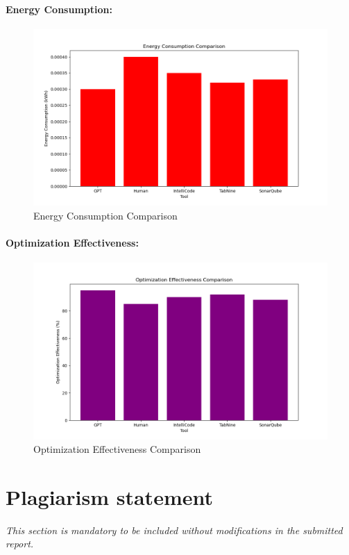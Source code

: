 \documentclass[conference,compsoc]{IEEEtran}
\begin{document}
\paragraph{Energy Consumption:}
\begin{figure}[H]
    \centering
    \includegraphics[width=0.8\linewidth]{figures/energy_consumption_comparison.png}
    \caption{Energy Consumption Comparison}
    \label{fig:energy_consumption_comparison}
\end{figure}

\paragraph{Optimization Effectiveness:}
\begin{figure}[H]
    \centering
    \includegraphics[width=0.8\linewidth]{figures/optimization_effectiveness_comparison.png}
    \caption{Optimization Effectiveness Comparison}
    \label{fig:optimization_effectiveness_comparison}
\end{figure}

\section*{Plagiarism statement}
 {\it This section is mandatory to be included without modifications in the submitted report.}\\
\end{document}

